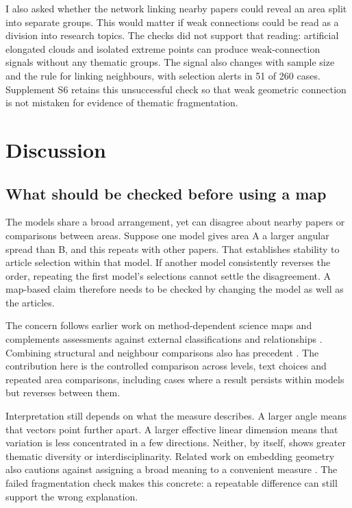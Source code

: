 \documentclass[12pt]{article}
\begin{document}
I also asked whether the network linking nearby papers could reveal an area split into separate groups. This would matter if weak connections could be read as a division into research topics. The checks did not support that reading: artificial elongated clouds and isolated extreme points can produce weak-connection signals without any thematic groups. The signal also changes with sample size and the rule for linking neighbours, with selection alerts in 51 of 260 cases. Supplement S6 retains this unsuccessful check so that weak geometric connection is not mistaken for evidence of thematic fragmentation.

\FloatBarrier
\section{Discussion}
\subsection{What should be checked before using a map}
The models share a broad arrangement, yet can disagree about nearby papers or comparisons between areas. Suppose one model gives area A a larger angular spread than B, and this repeats with other papers. That establishes stability to article selection within that model. If another model consistently reverses the order, repeating the first model's selections cannot settle the disagreement. A map-based claim therefore needs to be checked by changing the model as well as the articles.

The concern follows earlier work on method-dependent science maps \citep{refa0d2d707e6,ref6a2f5912bc} and complements assessments against external classifications and relationships \citep{refbe130e2973,refc0e2cc29e0}. Combining structural and neighbour comparisons also has precedent \citep{ref4e1e0d5582}. The contribution here is the controlled comparison across levels, text choices and repeated area comparisons, including cases where a result persists within models but reverses between them.

Interpretation still depends on what the measure describes. A larger angle means that vectors point further apart. A larger effective linear dimension means that variation is less concentrated in a few directions. Neither, by itself, shows greater thematic diversity or interdisciplinarity. Related work on embedding geometry also cautions against assigning a broad meaning to a convenient measure \citep{rudman-etal-2022-isoscore}. The failed fragmentation check makes this concrete: a repeatable difference can still support the wrong explanation.
\end{document}
